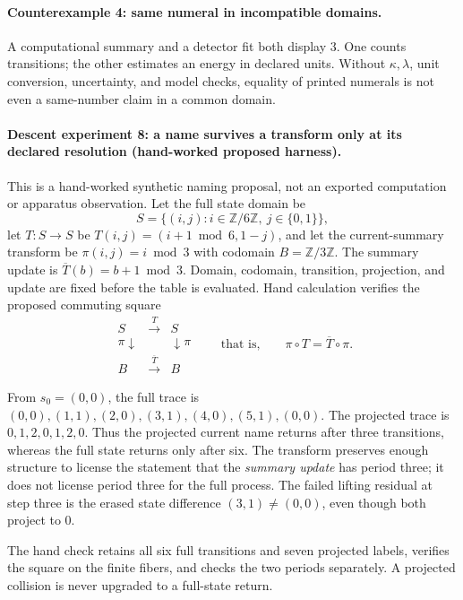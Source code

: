 \paragraph{Counterexample 4: same numeral in incompatible domains.}
A computational summary and a detector fit both display \(3\).  One counts transitions; the other estimates an energy
in declared units.  Without \(\kappa,\lambda\), unit conversion, uncertainty, and model checks, equality of printed
numerals is not even a same-number claim in a common domain.

\paragraph{Descent experiment 8: a name survives a transform only at its declared resolution (hand-worked proposed harness).}
This is a hand-worked synthetic naming proposal, not an exported computation or apparatus observation.  Let the full
state domain be
\[
 S=\{(i,j):i\in\mathbb Z/6\mathbb Z,\ j\in\{0,1\}\},
\]
let \(T:S\to S\) be \(T(i,j)=(i+1\bmod6,1-j)\), and let the current-summary transform be
\(\pi(i,j)=i\bmod3\) with codomain \(B=\mathbb Z/3\mathbb Z\).  The summary update is
\(\overline T(b)=b+1\bmod3\).  Domain, codomain, transition, projection, and update are fixed before the table is
evaluated.  Hand calculation verifies the proposed commuting square
\[
 \begin{array}{ccc}
 S&\xrightarrow{T}&S\\
 \pi\downarrow&&\downarrow\pi\\
 B&\xrightarrow{\overline T}&B
 \end{array}
 \qquad\text{that is,}\qquad \pi\circ T=\overline T\circ\pi.
\]

From \(s_0=(0,0)\), the full trace is
\((0,0),(1,1),(2,0),(3,1),(4,0),(5,1),(0,0)\).  The projected trace is
\(0,1,2,0,1,2,0\).  Thus the projected current name returns after three transitions, whereas the full state returns
only after six.  The transform preserves enough structure to license the statement that the \emph{summary update}
has period three; it does not license period three for the full process.  The failed lifting residual at step three
is the erased state difference \((3,1)\ne(0,0)\), even though both project to \(0\).

The hand check retains all six full transitions and seven projected labels, verifies the square on the finite fibers,
and checks the two periods separately.  A projected collision is never upgraded to a full-state return.

